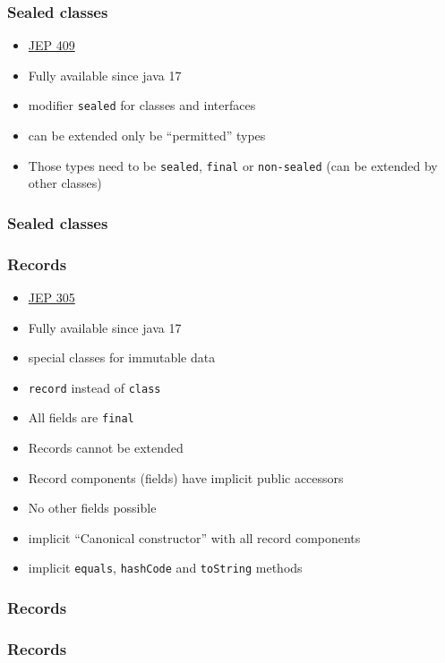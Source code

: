 \documentclass{beamer}
\begin{document}
\begin{frame}
\frametitle{Sealed classes}
\begin{itemize}
  \item \href{https://openjdk.java.net/jeps/409}{JEP 409}
  \item Fully available since java 17
  \pause
  \item modifier \texttt{sealed} for classes and interfaces
  \item can be extended only be ``permitted'' types
  \item Those types need to be \texttt{sealed}, \texttt{final} or \texttt{non-sealed} (can be extended by other classes)
\end{itemize}
\end{frame}

\begin{frame}
\frametitle{Sealed classes}




\end{frame}

\begin{frame}
\frametitle{Records}
\begin{itemize}
  \item \href{https://openjdk.org/jeps/395}{JEP 305}
  \item Fully available since java 17
  \pause
  \item special classes for immutable data
  \item \texttt{record} instead of \texttt{class}
  \item All fields are \texttt{final}
  \item Records cannot be extended
  \item Record components (fields) have implicit public accessors
  \item No other fields possible
  \item implicit ``Canonical constructor'' with all record components
  \item implicit \texttt{equals}, \texttt{hashCode} and \texttt{toString} methods
\end{itemize}
\end{frame}
\begin{frame}
\frametitle{Records}

\end{frame}
\begin{frame}
\frametitle{Records}

\end{frame}
\end{document}
